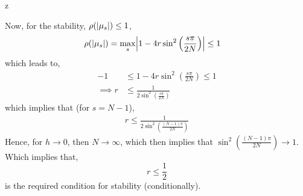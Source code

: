 z\documentclass[a4paper,12pt,twoside]{book}
\DeclarePairedDelimiter\abs{\lvert}{\rvert}
\begin{document}
Now, for the stability, $\rho(\abs{\mu_s}) \le 1$, 
\begin{equation}
    \begin{split}
		\rho(\abs{\mu_s}) = \underset{s}{\max}\abs*{1-4r\sin^2\left(\frac{s\pi}{2N}\right)}&\le 1
    \end{split}
\end{equation}
which leads to,
\begin{equation*}
	\begin{split}
		-1&\le 1-4r\sin^2\left(\frac{s\pi}{2N}\right) \le 1\\
	\implies r&\le	\frac{1}{2\sin^2\left(\frac{s\pi}{2N}\right)}
	\end{split}
\end{equation*}
which implies that (for $s=N-1$),
\begin{equation}
	\begin{split}
		r\le \frac{1}{2\sin^2\left(\frac{(N-1)\pi}{2N}\right)}
	\end{split}
\end{equation}
Hence, for $h\to 0$, then $N\to \infty$, which then implies that $\sin^2\left(\frac{(N-1)\pi}{2N}\right) \to 1$. Which implies that,
\begin{equation}
	r\le \frac{1}{2}
\end{equation}
is the required condition for stability (conditionally).
\end{document}
